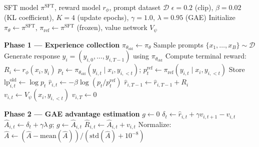 \documentclass{book}
\begin{document}
\begin{algorithm}[H]
\caption{PPO-RLHF with GAE}
\label{alg:ppo_rlhf}
\begin{algorithmic}[1]
\Require SFT model $\pi^{\text{SFT}}$, reward model $r_\phi$,
    prompt dataset $\mathcal{D}$
\Require $\epsilon = 0.2$ (clip), $\beta = 0.02$ (KL coefficient),
    $K = 4$ (update epochs), $\gamma = 1.0$, $\lambda = 0.95$ (GAE)
\State Initialize $\pi_\theta \leftarrow \pi^{\text{SFT}}$,
    $\pi_{\text{ref}} \leftarrow \pi^{\text{SFT}}$ (frozen),
    value network $V_\psi$

\Repeat
    \State \textbf{Phase 1 --- Experience collection}
    \State $\pi_{\theta_{\text{old}}} \leftarrow \pi_\theta$
    \State Sample prompts $\{x_1, \ldots, x_B\} \sim \mathcal{D}$
        \State Generate response $y_i = (y_{i,0}, \ldots, y_{i,T-1})$
            using $\pi_{\theta_{\text{old}}}$
        \State Compute terminal reward: $R_i \leftarrow r_\phi(x_i, y_i)$
            \State $p_t \leftarrow \pi_{\theta_{\text{old}}}(y_{i,t}
                \mid x_i, y_{i,<t})$;\quad
                $p_t^{\text{ref}} \leftarrow \pi_{\text{ref}}(y_{i,t}
                \mid x_i, y_{i,<t})$
            \State Store $\mathrm{lp}_{i,t}^{\text{old}} \leftarrow \log p_t$
            \State $\hat{r}_{i,t} \leftarrow
                -\beta \log(p_t / p_t^{\text{ref}})$
        \EndFor
        \State $\hat{r}_{i,T-1} \leftarrow \hat{r}_{i,T-1} + R_i$
            \State $v_{i,t} \leftarrow V_\psi(x_i, y_{i,<t})$
        \EndFor
        \State $v_{i,T} \leftarrow 0$ 
    \EndFor

    \State \textbf{Phase 2 --- GAE advantage estimation}
        \State $g \leftarrow 0$
            \State $\delta_t \leftarrow
                \hat{r}_{i,t} + \gamma v_{i,t+1} - v_{i,t}$
            \State $\hat{A}_{i,t} \leftarrow \delta_t + \gamma\lambda\, g$;\quad
                $g \leftarrow \hat{A}_{i,t}$
            \State $\hat{R}_{i,t} \leftarrow \hat{A}_{i,t} + v_{i,t}$
        \EndFor
    \EndFor
    \State Normalize: $\hat{A} \leftarrow
        (\hat{A} - \mathrm{mean}(\hat{A})) /
        (\mathrm{std}(\hat{A}) + 10^{-8})$


\end{algorithmic}
\end{algorithm}
\end{document}
